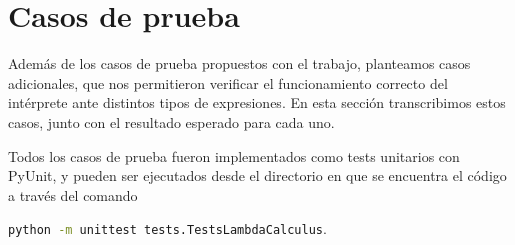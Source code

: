 \documentclass[11pt]{article}
\begin{document}


\section{Casos de prueba}



Además de los casos de prueba propuestos con el trabajo, planteamos casos
adicionales, que nos permitieron verificar el funcionamiento correcto del
intérprete ante distintos tipos de expresiones. En esta sección transcribimos
estos casos, junto con el resultado esperado para cada uno.

Todos los casos de prueba fueron implementados como tests unitarios con
PyUnit, y pueden ser ejecutados desde el directorio en que se encuentra el
código a través del comando
\begin{center}\lstinline[language=bash]
	{python -m unittest tests.TestsLambdaCalculus}.
\end{center}
\end{document}
